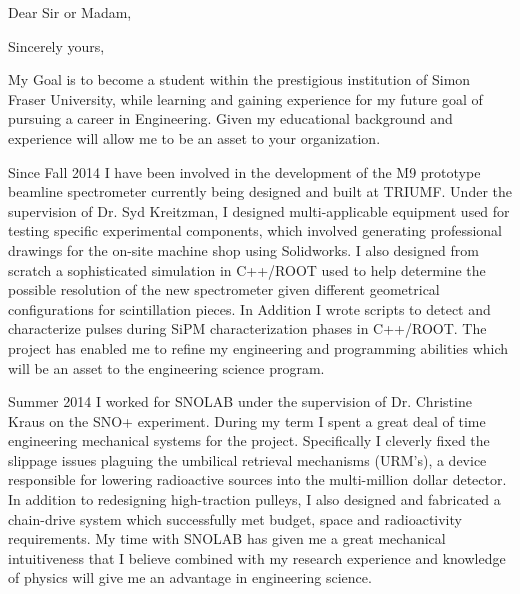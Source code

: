 \documentclass[11pt,a4paper,sans]{moderncv} %
\begin{document}


\clearpage

\date{\today} %
\opening{Dear Sir or Madam,} %
\closing{Sincerely yours,} %

\makelettertitle %
My Goal is to become a student within the prestigious institution of Simon Fraser University, while learning and gaining experience for my future goal of pursuing a career in Engineering. Given my educational background and experience will allow me to be an asset to your organization.

Since Fall 2014 I have been involved in the development of the M9 prototype beamline spectrometer currently being designed and built at TRIUMF. Under the supervision of Dr. Syd Kreitzman, I designed multi-applicable equipment used for testing specific experimental components, which involved generating professional drawings for the on-site machine shop using Solidworks. I also designed from scratch a sophisticated simulation in C++/ROOT used to help determine the possible resolution of the new spectrometer given different geometrical configurations for scintillation pieces. In Addition I wrote scripts to detect and characterize pulses during SiPM characterization phases in C++/ROOT. The project has enabled me to refine my engineering and programming abilities which will be an asset to the engineering science program. 

Summer 2014 I worked for SNOLAB under the supervision of Dr. Christine Kraus on the SNO+ experiment. During my term I spent a great deal of time engineering mechanical systems for the project. Specifically I cleverly fixed the slippage issues plaguing the umbilical retrieval mechanisms (URM's), a device responsible for lowering radioactive sources into the multi-million dollar detector. In addition to redesigning high-traction pulleys, I also designed and fabricated a chain-drive system which successfully met budget, space and radioactivity requirements. My time with SNOLAB has given me a great mechanical intuitiveness that I believe combined with my research experience and knowledge of physics will give me an advantage in engineering science.
\end{document}
